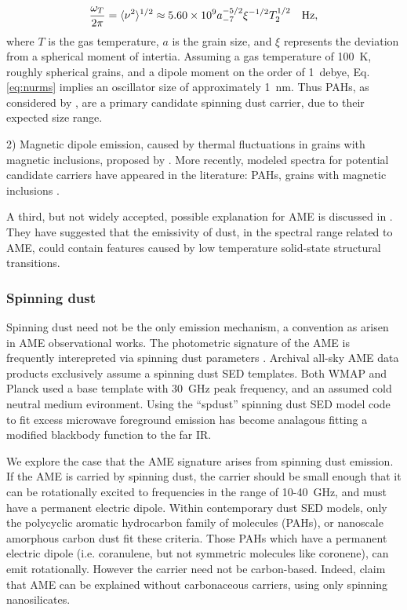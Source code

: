     \begin{equation}
    {\omega_T\over 2\pi} =
    \langle\nu^2\rangle^{1/2}
    \approx 5.60\times 10^9 a_{-7}^{-5/2}\xi^{-1/2}T_2^{1/2}~~~{\rm Hz},
    \label{eq:nurms}
    \end{equation}
    where $T$ is the gas temperature, $a$ is the grain size, and $\xi$ represents the deviation from a spherical moment of intertia. Assuming a gas temperature of 100~K, roughly spherical grains, and a dipole moment on the order of 1~debye, Eq. \ref{eq:nurms} implies an oscillator size of approximately 1~nm. Thus PAHs, as considered by \cite{ysard10a}, are a primary candidate spinning dust carrier, due to their expected size range.

    2) Magnetic dipole emission, caused by thermal fluctuations in grains with magnetic inclusions, proposed by \cite{draine99}.
     More recently, modeled spectra for potential candidate carriers have appeared in the literature: PAHs, grains with magnetic inclusions \citep{draine13, ali-haimoud14, hoang16a}.

    A third, but not widely accepted, possible explanation for AME is discussed in \cite{jones09}. They have suggested that the emissivity of dust, in the spectral range related to AME, could contain features caused by low temperature solid-state structural transitions.

    \subsubsection{Spinning dust}
     Spinning dust need not be the only emission mechanism, a convention as arisen in AME observational works. The photometric signature of the AME is frequently interepreted via spinning dust parameters \citep{ysard11,ali-haimoud10}. Archival all-sky AME data products exclusively assume a spinning dust SED templates. Both WMAP and Planck used a base template with 30~GHz peak frequency, and an assumed cold neutral medium evironment. Using the ``spdust'' spinning dust SED model code to fit excess microwave foreground emission has become analagous fitting a modified blackbody function to the far IR.

      We explore the case that the AME signature arises from spinning dust emission. If the AME is carried by spinning dust, the carrier should be small enough that it can be rotationally excited to frequencies in the range of 10-40~GHz, and must have a permanent electric dipole. Within contemporary dust SED models, only the polycyclic aromatic hydrocarbon family of molecules (PAHs), or nanoscale amorphous carbon dust fit these criteria. Those PAHs which have a permanent electric dipole (i.e. coranulene, but not symmetric molecules like coronene), can emit rotationally. However the carrier need not be carbon-based. Indeed, \cite{hensley17a} claim that AME can be explained without carbonaceous carriers, using only spinning nanosilicates.

